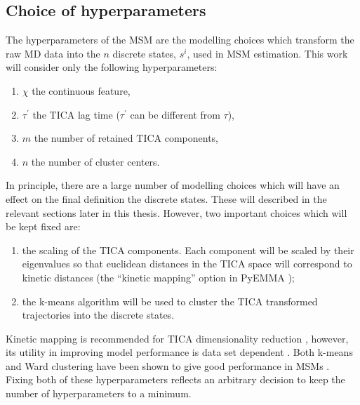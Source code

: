 \subsection{Choice of hyperparameters}\label{sec:theory_choice_hyp}
The hyperparameters of the MSM are the modelling choices which transform the raw MD data into the $n$ discrete states, $s^{i}$, used in MSM estimation. This work will consider only the following hyperparameters: 
\begin{enumerate}
    \item $\chi$ the continuous feature,
    \item $\tau^{\prime}$ the TICA lag time ($\tau^{\prime}$ can be different from $\tau$), 
    \item $m$ the number of retained TICA components, 
    \item $n$ the number of cluster centers. 
\end{enumerate}
In principle, there are a large number of modelling choices which will have an effect on the final definition the discrete states. These will described in the relevant sections later in this thesis. However, two important choices which will be kept fixed are: 
\begin{enumerate}
    \item the scaling of the TICA components. Each component will be scaled by their eigenvalues  so that euclidean distances in the TICA space will correspond to kinetic distances \cite{noeKineticDistanceKinetic2015} (the ``kinetic mapping'' option in PyEMMA \cite{schererPyEMMASoftwarePackage2015a});
    \item the k-means \cite{lloydLeastSquaresQuantization1982} algorithm will be used to cluster the TICA transformed trajectories into the discrete states. 
\end{enumerate}
Kinetic mapping is recommended for TICA dimensionality reduction \cite{noeKineticDistanceKinetic2015}, however, its utility in improving model performance is data set dependent \cite{husicOptimizedParameterSelection2016}. Both k-means and Ward clustering have been shown to give good performance in MSMs \cite{husicWardClusteringImproves2017a}. Fixing both of these hyperparameters reflects an arbitrary decision to keep the number of hyperparameters to a minimum.

